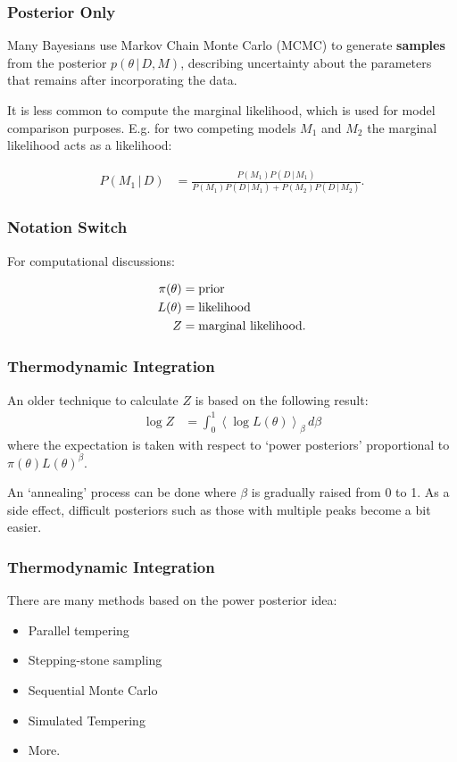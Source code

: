\documentclass{beamer}
\newcommand{\given}{\,|\,}
\begin{document}
\begin{frame}
\frametitle{Posterior Only}
Many Bayesians use Markov Chain Monte Carlo (MCMC) to generate {\bf samples}
from the posterior $p(\theta \given D, M)$, describing uncertainty about the
parameters that remains after incorporating the data.\\[0.5em]\pause

It is less common to compute the marginal likelihood, which is used for
model comparison purposes. E.g. for two competing models $M_1$ and $M_2$
the marginal likelihood acts as a likelihood:

\begin{align}
P(M_1 \given D) &= \frac{P(M_1)P(D \given M_1)}
                        {P(M_1)P(D \given M_1) + P(M_2)P(D \given M_2)}.
\end{align}

\end{frame}


\begin{frame}
\frametitle{Notation Switch}
For computational discussions:

\begin{align}
\pi(\theta) &= \textnormal{prior} \\
L(\theta) &= \textnormal{likelihood} \\
Z &= \textnormal{marginal likelihood}.
\end{align}

\end{frame}


\begin{frame}
\frametitle{Thermodynamic Integration}
An older technique to calculate $Z$ is based on the following
result:
\begin{align}
\log Z &= \int_0^1 \left<\log L(\theta)\right>_\beta \, d\beta
\end{align}
\pause
where the expectation is taken with respect to `power posteriors'
proportional to $\pi(\theta)L(\theta)^\beta$. \\[0.5em]\pause

An `annealing' process can be done
where $\beta$ is gradually raised from 0 to 1. As a side effect, difficult
posteriors such as those with multiple peaks become a bit easier.

\end{frame}


\begin{frame}
\frametitle{Thermodynamic Integration}
There are many methods based on the power posterior idea:

\begin{itemize}
\item Parallel tempering
\item Stepping-stone sampling
\item Sequential Monte Carlo
\item Simulated Tempering
\item More.
\end{itemize}

\end{frame}
\end{document}
